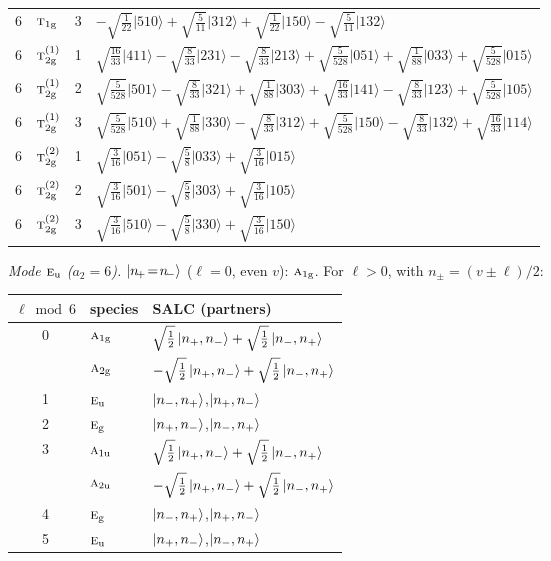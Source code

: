 \documentclass[11pt]{article}
\newcommand{\irr}[1]{\text{\normalfont\scshape #1}}
\newcommand{\ptag}[1]{\mathrm{#1}}
\newcommand{\occ}[1]{\lvert #1\rangle}
\begin{document}
\begin{longtable}{c l c p{}}
6 & $\irr{t}_{1\ptag{g}}$ & 3 & $-\sqrt{\tfrac{1}{22}}\occ{510}+\sqrt{\tfrac{5}{11}}\occ{312}+\sqrt{\tfrac{1}{22}}\occ{150}-\sqrt{\tfrac{5}{11}}\occ{132}$\\
6 & $\irr{t}_{2\ptag{g}}^{(1)}$ & 1 & $\sqrt{\tfrac{16}{33}}\occ{411}-\sqrt{\tfrac{8}{33}}\occ{231}-\sqrt{\tfrac{8}{33}}\occ{213}+\sqrt{\tfrac{5}{528}}\occ{051}+\sqrt{\tfrac{1}{88}}\occ{033}+\sqrt{\tfrac{5}{528}}\occ{015}$\\
6 & $\irr{t}_{2\ptag{g}}^{(1)}$ & 2 & $\sqrt{\tfrac{5}{528}}\occ{501}-\sqrt{\tfrac{8}{33}}\occ{321}+\sqrt{\tfrac{1}{88}}\occ{303}+\sqrt{\tfrac{16}{33}}\occ{141}-\sqrt{\tfrac{8}{33}}\occ{123}+\sqrt{\tfrac{5}{528}}\occ{105}$\\
6 & $\irr{t}_{2\ptag{g}}^{(1)}$ & 3 & $\sqrt{\tfrac{5}{528}}\occ{510}+\sqrt{\tfrac{1}{88}}\occ{330}-\sqrt{\tfrac{8}{33}}\occ{312}+\sqrt{\tfrac{5}{528}}\occ{150}-\sqrt{\tfrac{8}{33}}\occ{132}+\sqrt{\tfrac{16}{33}}\occ{114}$\\
6 & $\irr{t}_{2\ptag{g}}^{(2)}$ & 1 & $\sqrt{\tfrac{3}{16}}\occ{051}-\sqrt{\tfrac{5}{8}}\occ{033}+\sqrt{\tfrac{3}{16}}\occ{015}$\\
6 & $\irr{t}_{2\ptag{g}}^{(2)}$ & 2 & $\sqrt{\tfrac{3}{16}}\occ{501}-\sqrt{\tfrac{5}{8}}\occ{303}+\sqrt{\tfrac{3}{16}}\occ{105}$\\
6 & $\irr{t}_{2\ptag{g}}^{(2)}$ & 3 & $\sqrt{\tfrac{3}{16}}\occ{510}-\sqrt{\tfrac{5}{8}}\occ{330}+\sqrt{\tfrac{3}{16}}\occ{150}$\\
\hline
\end{longtable}

\emph{Mode $\irr{e}_{\ptag{u}}$ ($a_2=6$).} $\ket{n_{\!+}\!=\!n_{\!-}}$ ($\ell=0$, even $v$): $\irr{a}_{1\ptag{g}}$. For $\ell>0$, with $n_\pm=(v\pm\ell)/2$:
\begin{longtable}{c l l}\hline $\ell\bmod 6$ & species & SALC (partners)\\ \hline\endhead
0 & $\irr{a}_{1\ptag{g}}$ & $\sqrt{\tfrac{1}{2}}\ket{n_+,n_-}+\sqrt{\tfrac{1}{2}}\ket{n_-,n_+}$\\
 & $\irr{a}_{2\ptag{g}}$ & $-\sqrt{\tfrac{1}{2}}\ket{n_+,n_-}+\sqrt{\tfrac{1}{2}}\ket{n_-,n_+}$\\
1 & $\irr{e}_{\ptag{u}}$ & $\ket{n_-,n_+}$,\quad $\ket{n_+,n_-}$\\
2 & $\irr{e}_{\ptag{g}}$ & $\ket{n_+,n_-}$,\quad $\ket{n_-,n_+}$\\
3 & $\irr{a}_{1\ptag{u}}$ & $\sqrt{\tfrac{1}{2}}\ket{n_+,n_-}+\sqrt{\tfrac{1}{2}}\ket{n_-,n_+}$\\
 & $\irr{a}_{2\ptag{u}}$ & $-\sqrt{\tfrac{1}{2}}\ket{n_+,n_-}+\sqrt{\tfrac{1}{2}}\ket{n_-,n_+}$\\
4 & $\irr{e}_{\ptag{g}}$ & $\ket{n_-,n_+}$,\quad $\ket{n_+,n_-}$\\
5 & $\irr{e}_{\ptag{u}}$ & $\ket{n_+,n_-}$,\quad $\ket{n_-,n_+}$\\
\hline\end{longtable}
\end{document}
